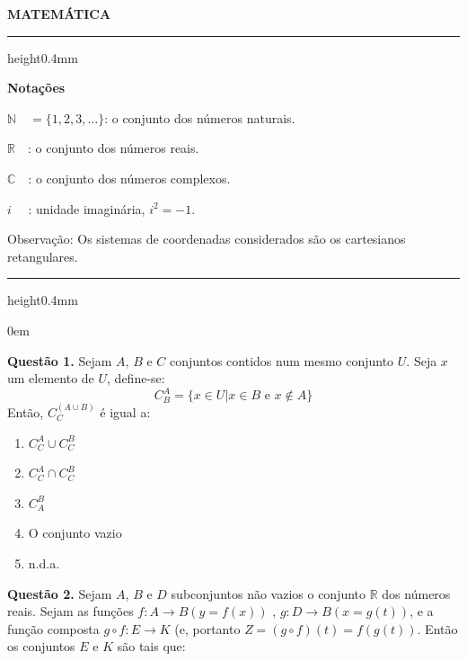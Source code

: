 \documentclass[11pt]{article}
\newcommand*\varhrulefill[1][0.4pt]{\leavevmode\leaders\hrule height#1\hfill\kern0pt}
\begin{document}
\begin{center}
    \textbf{MATEMÁTICA}
\end{center}

\noindent\varhrulefill[0.4mm]

\vspace{6pt}

\noindent \textbf{Notações}

\vspace{6pt}

$\mathbb{N}\quad = \{ 1,2,3, \dots \}$: o conjunto dos números naturais.

$\mathbb{R}\quad$: o conjunto dos números reais.

$\mathbb{C}\quad$: o conjunto dos números complexos.

$i \, \, \quad$: unidade imaginária, $i^2 = -1$.

\vspace{6pt}

\noindent Observação: Os sistemas de coordenadas considerados são os cartesianos retangulares.

\noindent\varhrulefill[0.4mm]

\vspace{6pt}

\parindent0em

\textbf{Questão 1.} Sejam  $A$,  $B$  e  $C$  conjuntos  contidos  num  mesmo  conjunto $U$. Seja $x$ um elemento de $U$, define-se: 
\[
C_B^A = \{ x \in U | x \in B \text{ e } x \not\in A \} 
\]
Então, $C_C^{(A \cup B)}$ é igual a:
\begin{multicols}{3}
    \begin{enumerate}[\bf A (\quad)]
        \item $C_C^A \cup C_C^B$
        \item $C_C^A \cap C_C^B$
        \item $C_A^B$
        \item O conjunto vazio
        \item n.d.a.
    \end{enumerate}
\end{multicols}

\textbf{Questão 2.} Sejam  $A$,  $B$  e  $D$  subconjuntos  não  vazios  o  conjunto  $\mathbb{R}$      dos      números      reais. Sejam as      funções $f: A \rightarrow B(y = f(x)) $ , $g: D \rightarrow B (x = g(t))$, e a função composta $g \circ f: E \rightarrow K$ (e,      portanto  $Z = (g \circ f)(t) = f(g(t))$.  Então  os  conjuntos  $E$  e  $K$  são tais que: 
\end{document}
